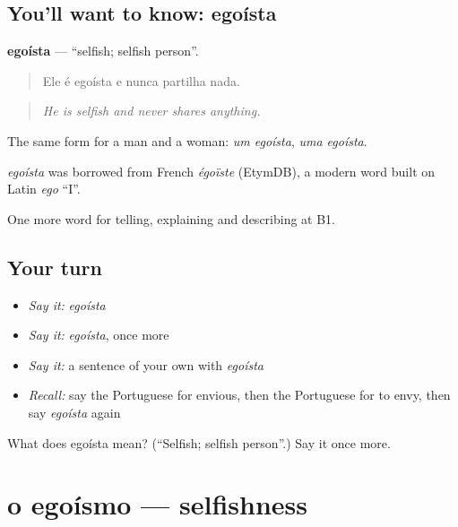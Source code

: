 \subsection*{You'll want to know: egoísta}
\textbf{egoísta} — \textquotedblleft{}selfish; selfish person\textquotedblright{}.

\begin{quote}
Ele é egoísta e nunca partilha nada.
\end{quote}

\begin{quote}
\emph{He is selfish and never shares anything.}
\end{quote}

The same form for a man and a woman: \emph{um egoísta}, \emph{uma egoísta}.

\begin{cousinweb}
\emph{egoísta} was borrowed from French \emph{égoïste} (EtymDB), a modern word built on Latin \emph{ego} \textquotedblleft{}I\textquotedblright{}.
\end{cousinweb}

\begin{grammarlens}[title={What you've built}]
One more word for telling, explaining and describing at B1.
\end{grammarlens}

\subsection*{Your turn}
\begin{itemize}
\raggedright
  \item \emph{Say it:} \emph{egoísta}
  \item \emph{Say it:} \emph{egoísta}, once more
  \item \emph{Say it:} a sentence of your own with \emph{egoísta}
  \item \emph{Recall:} say the Portuguese for envious, then the Portuguese for to envy, then say \emph{egoísta} again
\end{itemize}

\begin{tcolorbox}[breakable,colback=teal!4,colframe=teal!35!black,title={Before you move on}]
What does egoísta mean? (\textquotedblleft{}Selfish; selfish person\textquotedblright{}.) Say it once more.
\end{tcolorbox}
\section[o egoísmo]{o egoísmo — selfishness}

